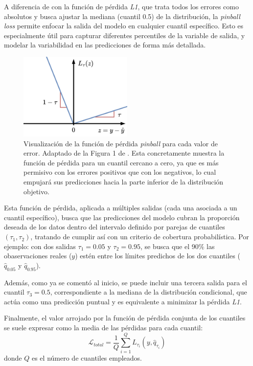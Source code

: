 \begin{itemize}
    A diferencia de con la función de pérdida \textit{L1}, que trata todos los errores como 
    absolutos y busca ajustar la mediana (cuantil 0.5) de la distribución, la \textit{pinball loss} permite 
    enfocar la salida del modelo en cualquier cuantil específico. Esto es especialmente útil para
    capturar diferentes percentiles de la variable de salida, y modelar la variabilidad en las predicciones 
    de forma más detallada.

    \begin{figure}[h]
        \centering
        \includegraphics[width=0.5\textwidth]{capitulos/cap_04/imagenes/pinball_loss.png}
        \caption[
            Visualización de la función de pérdida \textit{pinball} para cada valor de error.
        ]{
            Visualización de la función de pérdida \textit{pinball} para cada valor de error.
            Adaptado de la Figura 1 de \cite{romano2019}.
            Esta concretamente muestra la función de pérdida para un cuantil cercano a cero, 
            ya que es más permisivo con los errores positivos que con los negativos, lo cual 
            empujará sus predicciones hacia la parte inferior de la distribución objetivo.
        } 
        \label{fig:pinball_loss}
    \end{figure}

    
    Esta función de pérdida, aplicada a múltiples salidas (cada una asociada a un cuantil específico), busca 
    que las predicciones del modelo cubran la proporción deseada de los datos dentro del intervalo definido 
    por parejas de cuantiles $(\tau_1, \tau_2)$, tratando de cumplir así con un criterio de cobertura 
    probabilística. Por ejemplo: con dos salidas $\tau_1 = 0.05$ y $\tau_2 = 0.95$, se busca que el 90\% las 
    obaservaciones reales ($y$) estén entre los límites predichos de los dos cuantiles ($\hat{q}_{0.05}$ y 
    $\hat{q}_{0.95}$).

    Además, como ya se comentó al inicio, se puede incluir una tercera salida para el cuantil $\tau_3 = 0.5$, 
    correspondiente a la mediana de la distribución condicional, que actúa como una predicción puntual y es 
    equivalente a minimizar la pérdida \textit{L1}.

    Finalmente, el valor arrojado por la función de pérdida conjunta de los cuantiles se suele expresar como 
    la media de las pérdidas para cada cuantil:
    $$
    \mathcal{L}_{total} = \frac{1}{Q} \sum_{i=1}^Q L_{\tau_i} (y, \hat{q}_{\tau_i})
    $$
    donde $Q$ es el número de cuantiles empleados.

\end{itemize}

